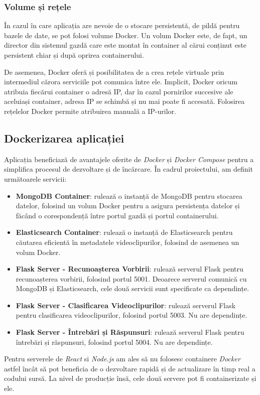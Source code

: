 \subsubsection{Volume și rețele}
\par
În cazul în care aplicația are nevoie de o stocare persistentă, de pildă pentru bazele de date, se pot
folosi volume Docker. Un volum Docker este, de fapt, un director din sistemul gazdă care este montat în
container al cărui conținut este persistent chiar și după oprirea containerului.

\par
De asemenea, Docker oferă și posibilitatea de a crea rețele virtuale prin intermediul cărora serviciile
pot comunica între ele. Implicit, Docker oricum atribuia fiecărui container o adresă IP, dar în cazul
pornirilor succesive ale aceluiași container, adresa IP se schimbă și nu mai poate fi accesată. Folosirea
rețelelor Docker permite atribuirea manuală a IP-urilor.

\subsection{Dockerizarea aplicației}
\par
Aplicația beneficiază de avantajele oferite de \textit{Docker} și \textit{Docker Compose} pentru a simplifica procesul
de dezvoltare și de încărcare. În cadrul proiectului, am definit următoarele servicii:

\begin{itemize}
    \item \textbf{MongoDB Container}: rulează o instanță de MongoDB pentru stocarea datelor, folosind
    un volum Docker pentru a asigura persistența datelor și făcând o corespondență între portul gazdă
    și portul containerului.
    \item \textbf{Elasticsearch Container}: rulează o instanță de Elasticsearch pentru căutarea eficientă
    în metadatele videoclipurilor, folosind de asemenea un volum Docker.
    \item \textbf{Flask Server - Recunoașterea Vorbirii}: rulează serverul Flask pentru recunoașterea
    vorbirii, folosind portul 5001. Deoarece serverul comunică cu MongoDB și Elasticsearch, cele două
    servicii sunt specificate ca dependințe.
    \item \textbf{Flask Server - Clasificarea Videoclipurilor}: rulează serverul Flask pentru clasificarea
    videoclipurilor, folosind portul 5003. Nu are dependințe.
    \item \textbf{Flask Server - Întrebări și Răspunsuri}: rulează serverul Flask pentru întrebări și
    răspunsuri, folosind portul 5004. Nu are dependințe.
\end{itemize}

\par
Pentru serverele de \textit{React} si \textit{Node.js} am ales să nu folosesc containere \textit{Docker}
astfel încât să pot beneficia de o dezvoltare rapidă și de actualizare în timp real a codului sursă. La
nivel de producție însă, cele două servere pot fi containerizate și ele.

